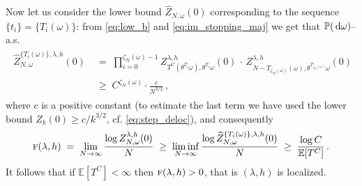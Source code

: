 \documentclass[reqno,11pt]{amsart}
\numberwithin{equation}{section}
\newcommand{\dd}{\,\text{\rm d}}             %
\newcommand{\bbE}{{\ensuremath{\mathbb E}} }
\newcommand{\bbP}{{\ensuremath{\mathbb P}} }
\newcommand{\go}{\omega}
\newcommand{\gl}{\lambda}
\newcommand{\tf}{\textsc{f}}
\begin{document}
Now let us consider the lower bound $\widehat{Z}_{N,\go}(0)$ corresponding to the sequence $\{t_i\}=\{T_i(\go)\}$: from \eqref{eq:low_b} and \eqref{eq:im_stopping_maj} we get that $\bbP(\dd\go)$--a.s.
\begin{align} \label{eq:major}
\begin{split}
\widehat{Z}_{N,\go}^{\{T_i(\go)\},\gl,h}(0) &\;=\; \prod_{i=0}^{\zeta_N(\go)-1} Z_{T^C(\theta^{T_i}\go),\theta^{T_i}\go}^{\gl,h}(0) \,\cdot\, Z_{N-T_{\zeta_N(\go)}(\go),\theta^{T_{\zeta_N(\go)}}\go}^{\gl,h}(0) \\
&\;\ge\; C^{\zeta_N(\go)} \cdot \frac{c}{N^{3/2}}\,,
\end{split}
\end{align}
where $c$ is a positive constant (to estimate the last term we have used the  lower bound $Z_k(0) \ge c/k^{3/2}$, cf. \eqref{eq:step_deloc}), and consequently
\begin{equation}
\tf(\gl,h) \;=\; \lim_{N\to\infty} \frac{\log Z_{N,\go}^{\gl,h}(0)}{N} \;\ge\; \liminf_{N\to\infty} \frac{\log \widehat{Z}_{N,\go}^{\{T_i(\go)\},\gl,h}(0)}{N} \;\ge\; \frac{\log C}{\bbE[T^C]}\,.
\end{equation}
It follows that if $\bbE[T^C]<\infty$  then $\tf(\gl,h)>0$, that is $(\gl,h)$ is localized.

\smallskip
\end{document}
